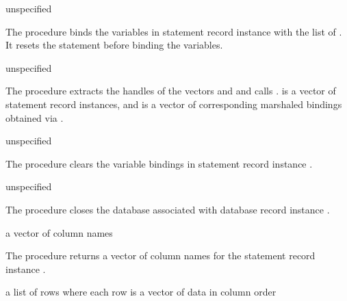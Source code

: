 \begin{procedure}
\end{procedure}
\returns{} unspecified

The  procedure binds the variables in statement
record instance  with the list of . It resets
the statement before binding the variables.

\begin{procedure}
\end{procedure}
\returns{} unspecified

The  procedure extracts the handles of the
vectors  and  and calls
.   is a vector of statement
record instances, and  is a vector of corresponding
marshaled bindings obtained via .

\begin{procedure}
\end{procedure}
\returns{} unspecified

The  procedure clears the variable
bindings in statement record instance .

\begin{procedure}
\end{procedure}
\returns{} unspecified

The  procedure closes the database associated with
database record instance .

\begin{procedure}
\end{procedure}
\returns{} a vector of column names

The  procedure returns a vector of column names
for the statement record instance .

\begin{procedure}
\end{procedure}
\returns{} a list of rows where each row is a vector of data in column order

